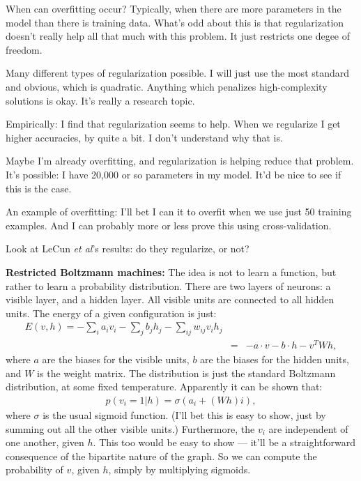 \documentclass[12pt]{report}
\begin{document}
When can overfitting occur?  Typically, when there are more parameters
in the model than there is training data.  What's odd about this is
that regularization doesn't really help all that much with this
problem.  It just restricts one degee of freedom.

Many different types of regularization possible.  I will just use the
most standard and obvious, which is quadratic.  Anything which
penalizes high-complexity solutions is okay.  It's really a research
topic.

Empirically: I find that regularization seems to help.  When we
regularize I get higher accuracies, by quite a bit.  I don't
understand why that is.

Maybe I'm already overfitting, and regularization is helping reduce
that problem.  It's possible: I have 20,000 or so parameters in my
model.  It'd be nice to see if this is the case.

An example of overfitting: I'll bet I can it to overfit when we use
just 50 training examples.  And I can probably more or less prove this
using cross-validation.

Look at LeCun \emph{et al}'s results: do they regularize, or not?

\textbf{Restricted Boltzmann machines:} The idea is not to learn a
function, but rather to learn a probability distribution.  There are
two layers of neurons: a visible layer, and a hidden layer.  All
visible units are connected to all hidden units.  The energy of a
given configuration is just:
\begin{eqnarray}
  E(v, h) = -\sum_i a_i v_i-\sum_j b_j h_j-\sum_{ij} w_{ij} v_i h_j \\
  & = & -a \cdot v-b\cdot h -v^T W h,
\end{eqnarray}
where $a$ are the biases for the visible units, $b$ are the biases for
the hidden units, and $W$ is the weight matrix.  The distribution is
just the standard Boltzmann distribution, at some fixed temperature.
Apparently it can be shown that:
\begin{eqnarray}
  p(v_i = 1 | h) = \sigma( a_i + (Wh)i),
\end{eqnarray}
where $\sigma$ is the usual sigmoid function.  (I'll bet this is easy
to show, just by summing out all the other visible units.)
Furthermore, the $v_i$ are independent of one another, given $h$.
This too would be easy to show --- it'll be a straightforward
consequence of the bipartite nature of the graph. So we can compute
the probability of $v$, given $h$, simply by multiplying sigmoids.
\end{document}
